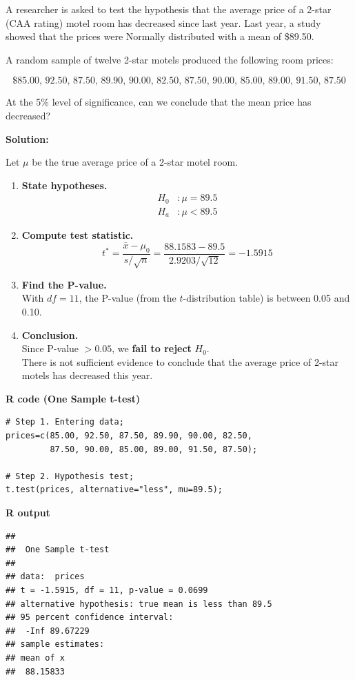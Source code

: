 \begin{example}

A researcher is asked to test the hypothesis that the average price of a 2-star (CAA rating) motel room has decreased since last year. Last year, a study showed that the prices were Normally distributed with a mean of \$89.50.

A random sample of twelve 2-star motels produced the following room prices:

\[
\text{\$85.00, 92.50, 87.50, 89.90, 90.00, 82.50, 87.50, 90.00, 85.00, 89.00, 91.50, 87.50}
\]

At the 5\% level of significance, can we conclude that the mean price has decreased?

\textbf{Solution:}

Let $\mu$ be the true average price of a 2-star motel room.

\begin{enumerate}
  \item \textbf{State hypotheses.}
\begin{align*}
H_0 &: \mu = 89.5 \\
H_a &: \mu < 89.5
\end{align*}


  \item \textbf{Compute test statistic.}
  \[
  t^\ast = \frac{\bar{x} - \mu_0}{s / \sqrt{n}} = \frac{88.1583 - 89.5}{2.9203 / \sqrt{12}} = -1.5915
  \]

  \item \textbf{Find the P-value.} \\
  With $df = 11$, the P-value (from the $t$-distribution table) is between 0.05 and 0.10.

  \item \textbf{Conclusion.} \\
  Since P-value $> 0.05$, we \textbf{fail to reject} $H_0$. \\
  There is not sufficient evidence to conclude that the average price of 2-star motels has decreased this year.
\end{enumerate}
\vspace{1em}
\noindent\textbf{R code (One Sample t-test)}
\begin{tcolorbox}[colback=gray!10, colframe=black!45, arc=2mm]
\begin{verbatim}
# Step 1. Entering data;
prices=c(85.00, 92.50, 87.50, 89.90, 90.00, 82.50,
         87.50, 90.00, 85.00, 89.00, 91.50, 87.50);

# Step 2. Hypothesis test;
t.test(prices, alternative="less", mu=89.5);
\end{verbatim}
\end{tcolorbox}
\vspace{1em}
\noindent\textbf{R output}
\begin{tcolorbox}[colback=gray!10, colframe=black!45, arc=2mm]
\begin{verbatim}
## 
##  One Sample t-test
## 
## data:  prices
## t = -1.5915, df = 11, p-value = 0.0699
## alternative hypothesis: true mean is less than 89.5
## 95 percent confidence interval:
##  -Inf 89.67229
## sample estimates:
## mean of x 
##  88.15833 
\end{verbatim}
\end{tcolorbox}



\end{example}
